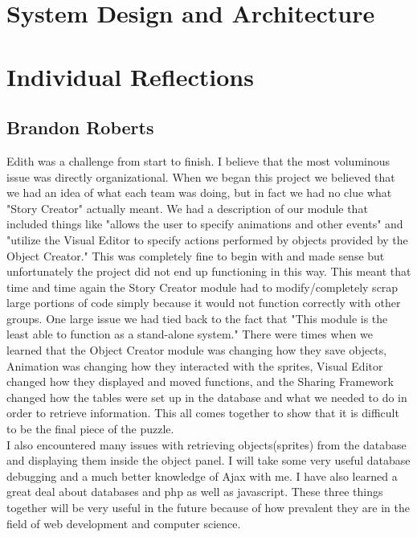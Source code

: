 \documentclass[12pt]{article}
\begin{document}
\section{System Design and Architecture}




\section{Individual Reflections}

\subsection{Brandon Roberts}
Edith was a challenge from start to finish.  I believe that the most voluminous issue was directly organizational.  When we began this project we believed that we had an idea of what each team was doing, but in fact we had no clue what "Story Creator" actually meant.  We had a description of our module that included things like "allows the user to specify animations and other events" and "utilize the Visual Editor to specify actions performed by objects provided by the Object Creator."  This was completely fine to begin with and made sense but unfortunately the project did not end up functioning in this way.  This meant that time and time again the Story Creator module had to modify/completely scrap large portions of code simply because it would not function correctly with other groups.  One large issue we had tied back to the fact that "This module is the least able to function as a stand-alone system."  There were times when we learned that the Object Creator module was changing how they save objects, Animation was changing how they interacted with the sprites, Visual Editor changed how they displayed and moved functions, and the Sharing Framework changed how the tables were set up in the database and what we needed to do in order to retrieve information.  This all comes together to show that it is difficult to be the final piece of the puzzle.  \\

I also encountered many issues with retrieving objects(sprites) from the database and displaying them inside the object panel.  I will take some very useful database debugging and a much better knowledge of Ajax with me.  I have also learned a great deal about databases and php as well as javascript.  These three things together will be very useful in the future because of how prevalent they are in the field of web development and computer science. \\
\end{document}
